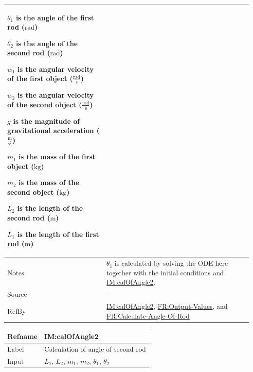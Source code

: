 \documentclass[12pt]{article}
\begin{document}
{\begin{minipage}{\textwidth}
\begin{tabular}{>{\raggedright}p{}>{\raggedright\arraybackslash}p{}}
\begin{symbDescription}
              \item{${θ_{1}}$ is the angle of the first rod (${\text{rad}}$)}
              \item{${θ_{2}}$ is the angle of the second rod (${\text{rad}}$)}
              \item{${w_{1}}$ is the angular velocity of the first object ($\frac{\text{rad}}{\text{s}}$)}
              \item{${w_{2}}$ is the angular velocity of the second object ($\frac{\text{rad}}{\text{s}}$)}
              \item{$g$ is the magnitude of gravitational acceleration ($\frac{\text{m}}{\text{s}^{2}}$)}
              \item{${m_{1}}$ is the mass of the first object (${\text{kg}}$)}
              \item{${m_{2}}$ is the mass of the second object (${\text{kg}}$)}
              \item{${L_{2}}$ is the length of the second rod (${\text{m}}$)}
              \item{${L_{1}}$ is the length of the first rod (${\text{m}}$)}
              \end{symbDescription}
\\ \midrule
Notes & ${θ_{1}}$ is calculated by solving the ODE here together with the initial conditions and \hyperref[IM:calOfAngle2]{IM:calOfAngle2}.
        
\\ \midrule
Source & --
         
\\ \midrule
RefBy & \hyperref[IM:calOfAngle2]{IM:calOfAngle2}, \hyperref[outputValues]{FR:Output-Values}, and \hyperref[calcAng]{FR:Calculate-Angle-Of-Rod}
        
\\ \bottomrule
\end{tabular}
\end{minipage}

\medskip
\noindent
\begin{minipage}{\textwidth}
\begin{tabular}{>{\raggedright}p{}>{\raggedright\arraybackslash}p{}}
\toprule \textbf{Refname} & \textbf{IM:calOfAngle2}
\label{IM:calOfAngle2}
\\ \midrule
Label & Calculation of angle of second rod
        
\\ \midrule
Input & ${L_{1}}$, ${L_{2}}$, ${m_{1}}$, ${m_{2}}$, ${θ_{1}}$, ${θ_{2}}$
        

\end{tabular}
\end{minipage}}
\end{document}
